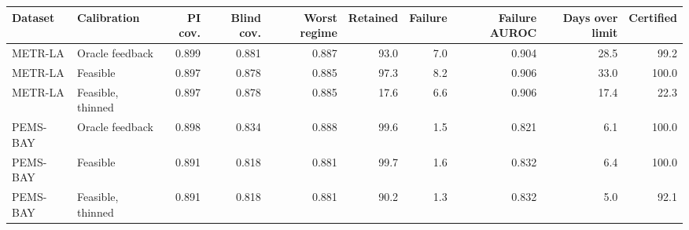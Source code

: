 \begin{tabular}{llrrrrrrrr}
\toprule
Dataset & Calibration & PI cov. & Blind cov. & Worst regime & Retained & Failure & Failure AUROC & Days over limit & Certified \\
\midrule
METR-LA & Oracle feedback & 0.899 & 0.881 & 0.887 & 93.0 & 7.0 & 0.904 & 28.5 & 99.2 \\
METR-LA & Feasible & 0.897 & 0.878 & 0.885 & 97.3 & 8.2 & 0.906 & 33.0 & 100.0 \\
METR-LA & Feasible, thinned & 0.897 & 0.878 & 0.885 & 17.6 & 6.6 & 0.906 & 17.4 & 22.3 \\
PEMS-BAY & Oracle feedback & 0.898 & 0.834 & 0.888 & 99.6 & 1.5 & 0.821 & 6.1 & 100.0 \\
PEMS-BAY & Feasible & 0.891 & 0.818 & 0.881 & 99.7 & 1.6 & 0.832 & 6.4 & 100.0 \\
PEMS-BAY & Feasible, thinned & 0.891 & 0.818 & 0.881 & 90.2 & 1.3 & 0.832 & 5.0 & 92.1 \\
\bottomrule
\end{tabular}
